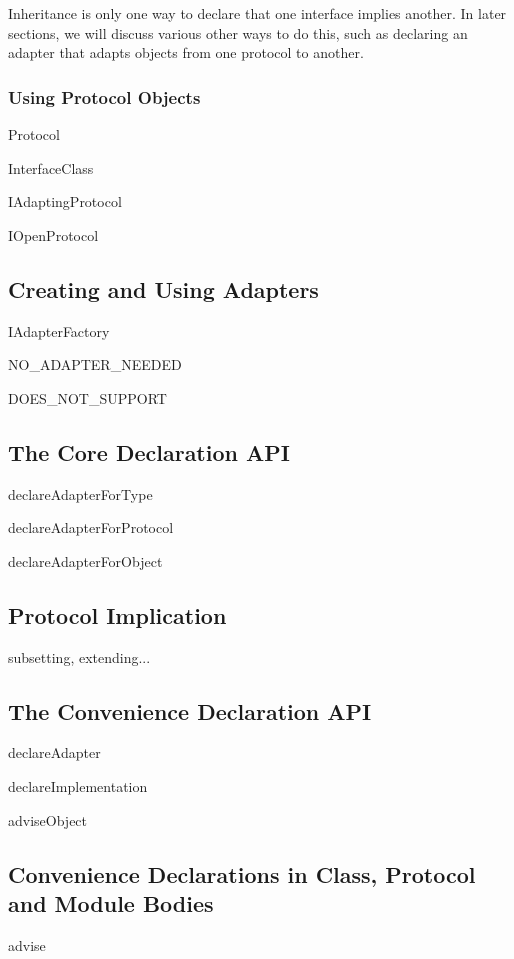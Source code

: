 \begin{verbatim%
}
\begin{verbatim%
}
Inheritance is only one way to declare that one interface implies another.  In
later sections, we will discuss various other ways to do this, such as
declaring an adapter that adapts objects from one protocol to another.

\subsubsection{Using Protocol Objects}

Protocol

InterfaceClass

IAdaptingProtocol

IOpenProtocol

\subsection{Creating and Using Adapters}

IAdapterFactory

NO_ADAPTER_NEEDED

DOES_NOT_SUPPORT


\subsection{The Core Declaration API}

declareAdapterForType

declareAdapterForProtocol

declareAdapterForObject


\subsection{Protocol Implication \label{proto-implication}}

subsetting, extending...

\subsection{The Convenience Declaration API}

declareAdapter

declareImplementation

adviseObject


\subsection{Convenience Declarations in Class, Protocol and Module Bodies}

advise


\end{verbatim%
}
\end{verbatim%
}
